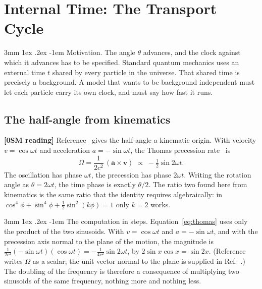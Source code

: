 \documentclass[%
 reprint, amsmath,amssymb, aps, prb, ]{revtex4-2}
\makeatletter
\numberwithin{equation}{section}
\renewcommand\paragraph{%
  \@startsection{paragraph}{4}{\z@}%
    {3mm \@plus 1ex \@minus .2ex}
    {-1em}
    {\normalfont\normalsize\itshape}}
\makeatother
\begin{document}
\section{Internal Time: The Transport Cycle}
\label{sec:time}

\paragraph{Motivation.} The angle $\theta$ advances, and the clock against which it advances has to be specified. Standard quantum mechanics uses an external time $t$ shared by every particle in the universe. That shared time is precisely a background. A model that wants to be background independent must let each particle carry its own clock, and must say how fast it runs.

\subsection{The half-angle from kinematics}

\textbf{[0SM reading]} Reference~\cite{ref:p10} gives the half-angle a kinematic origin. With velocity $v=\cos\omega t$ and acceleration $a=-\sin\omega t$, the Thomas precession rate~\cite{ref:thomas26,ref:thomas27} is
\begin{equation}
\Omega=\frac{1}{2c^2}\,(\mathbf{a}\times\mathbf{v})\;\propto\;-\tfrac12\sin2\omega t .
\label{eq:thomas}
\end{equation}
The oscillation has phase $\omega t$, the precession has phase $2\omega t$. Writing the rotation angle as $\theta=2\omega t$, the time phase is exactly $\theta/2$. The ratio two found here from kinematics is the same ratio that the identity requires algebraically: in $\cos^4\phi+\sin^4\phi+\tfrac12\sin^2(k\phi)=1$ only $k=2$ works.

\paragraph{The computation in steps.} Equation~\eqref{eq:thomas} uses only the product of the two sinusoids. With $v=\cos\omega t$ and $a=-\sin\omega t$, and with the precession axis normal to the plane of the motion, the magnitude is $\tfrac{1}{2c^2}(-\sin\omega t)(\cos\omega t)=-\tfrac{1}{4c^2}\sin2\omega t$, by $2\sin x\cos x=\sin2x$. (Reference~\cite{ref:p10} writes $\Omega$ as a scalar; the unit vector normal to the plane is supplied in Ref.~\cite{ref:p19}.) The doubling of the frequency is therefore a consequence of multiplying two sinusoids of the same frequency, nothing more and nothing less.
\end{document}
